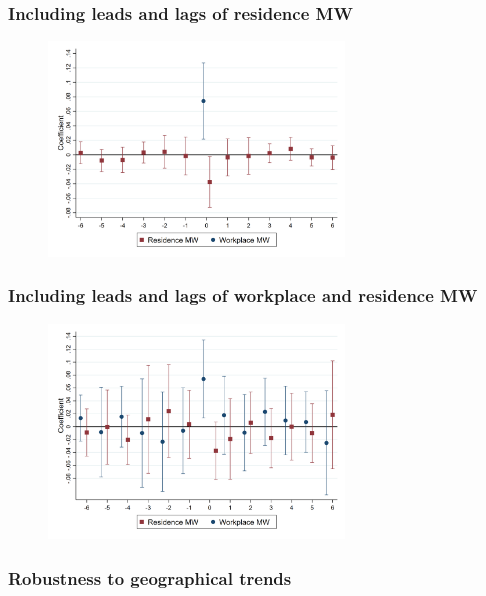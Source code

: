 \documentclass[aspectratio=169, t]{beamer}
\begin{document}
\begin{frame}[label = dynamic_mw]
	\frametitle{Including leads and lags of residence MW}
	\begin{figure}[h!]
	\centering
		\includegraphics[width=0.7\textwidth]{fd_baseline/output/fd_both_ln_mw_dynamic.png}
	\end{figure}
	\hyperlink{dyn_baseline_plot}{}
\end{frame}

\begin{frame}[label = fd_both_dynamic]
	\frametitle{Including leads and lags of workplace and residence MW}
	\begin{figure}[h!]
	\centering
		\includegraphics[width=0.7\textwidth]{fd_baseline/output/fd_both_dynamic}
	\end{figure}
	\hyperlink{dyn_baseline_plot}{}
\end{frame}

\begin{frame}[label = robustness_geo]
	\frametitle{Robustness to geographical trends}
	
	
	
	\hyperlink{robus_sample}{}
\end{frame}
\end{document}

